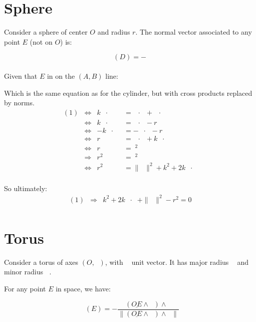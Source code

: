 \documentclass[10pt,a4paper]{article}
\newcommand{\ud}[1]{\underline{#1}}
\DeclareMathOperator{\cross}{\wedge}
\DeclareMathOperator{\AO}{\ud{AO}}
\DeclareMathOperator{\OA}{\ud{OA}}
\DeclareMathOperator{\OD}{\ud{OD}}
\DeclareMathOperator{\eA}{\ud{e}_A}
\DeclareMathOperator{\n}{\ud{n}}
\DeclareMathOperator{\z}{\ud{z}}
\DeclareMathOperator{\ODn}{\|\ud{OD}\|}
\DeclareMathOperator{\ra}{r_{a}}
\DeclareMathOperator{\ea}{\ud{e}_{a}}
\DeclareMathOperator{\rb}{r_{b}}
\begin{document}
\newpage
\section{Sphere}

Consider a sphere of center $O$ and radius $r$.
The normal vector associated to any point $E$ (not on $O$) is:

$$
\n(D) = - \frac{\OD}{\ODn}
$$

Given that $E$ in on the $(A, B)$ line:

Which is the same equation as for the cylinder, but with cross products
replaced by norms.
$$
\begin{array}{llll}
    (1)
    
    & \Leftrightarrow &
    k\eA\cdot\n
    & = \AO\cdot\n + \OD\cdot \n\\
    
    & \Leftrightarrow &
    k\eA\cdot\n
    & = \AO\cdot\n - r\\
    
    & \Leftrightarrow &
    -k\eA\cdot\OD
    & = -\AO\cdot\OD - r\ODn\\
    
    & \Leftrightarrow &
    r\ODn
    & = \OA\cdot\OD + k\eA\cdot\OD\\
    
    & \Leftrightarrow &
    r\ODn
    & = \ODn^2\\

    & \Rightarrow &
    r^2
    & = \ODn^2\\

    & \Leftrightarrow &
    r^2
    & = \|\OA\|^2 + k^2 + 2k\OA\cdot\eA\\
\end{array}
$$

So ultimately:
$$
\begin{array}{llll}
    (1)
    & \Rightarrow &
    k^2 + 2k\OA\cdot\eA + \|\OA\|^2 - r^2 = 0\\
\end{array}
$$


\newpage
\section{Torus}

Consider a torus of axes $(O, \z)$, with $\z$  unit vector.
It has major radius $\ra$ and minor radius $\rb$.

For any point $E$ in space, we have:

$$
    \ea(E) = - \frac{(\ud{OE} \cross  \z) \cross \z}{
    \|(\ud{OE} \cross  \z) \cross \z\|
}
$$
\end{document}
